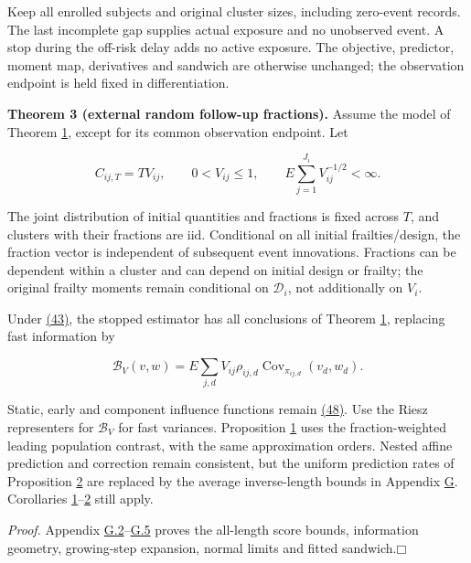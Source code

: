 \documentclass[11pt]{article}
\providecommand{\square}{\mdlgwhtsquare}
\begin{document}
Keep all enrolled subjects and original cluster sizes, including zero-event records. The last incomplete gap supplies actual exposure and no unobserved event. A stop during the off-risk delay adds no active exposure. The objective, predictor, moment map, derivatives and sandwich are otherwise unchanged; the observation endpoint is held fixed in differentiation.

\label{res:Theorem-3}
\textbf{Theorem 3 (external random follow-up fractions).} Assume the model of Theorem \hyperref[res:Theorem-1]{1}, except for its common observation endpoint. Let

\begin{equation*}
C_{ij,T}=TV_{ij},\qquad 0<V_{ij}\leq1,\qquad
E\sum_{j=1}^{J_i}V_{ij}^{-1/2}<\infty.
\tag{70}\label{eq:70}
\end{equation*}

The joint distribution of initial quantities and fractions is fixed across \(T\), and clusters with their fractions are iid. Conditional on all initial frailties/design, the fraction vector is independent of subsequent event innovations. Fractions can be dependent within a cluster and can depend on initial design or frailty; the original frailty moments remain conditional on \(\mathcal D_i\), not additionally on \(V_i\).

Under \hyperref[eq:43]{(43)}, the stopped estimator has all conclusions of Theorem \hyperref[res:Theorem-1]{1}, replacing fast information by

\begin{equation*}
\mathcal B_V(v,w)=E\sum_{j,d}V_{ij}\rho_{ij,d}
 \operatorname{Cov}_{\pi_{ij,d}}(v_d,w_d).
\tag{71}\label{eq:71}
\end{equation*}

Static, early and component influence functions remain \hyperref[eq:48]{(48)}. Use the Riesz representers for \(\mathcal B_V\) for fast variances. Proposition \hyperref[res:Proposition-1]{1} uses the fraction-weighted leading population contrast, with the same approximation orders. Nested affine prediction and correction remain consistent, but the uniform prediction rates of Proposition \hyperref[res:Proposition-2]{2} are replaced by the average inverse-length bounds in Appendix \hyperref[sec:G]{G}. Corollaries \hyperref[res:Corollary-1]{1}--\hyperref[res:Corollary-2]{2} still apply.

\textit{Proof.} Appendix \hyperref[sec:G.2]{G.2}--\hyperref[sec:G.5]{G.5} proves the all-length score bounds, information geometry, growing-step expansion, normal limits and fitted sandwich.\hfill$\square$
\end{document}
